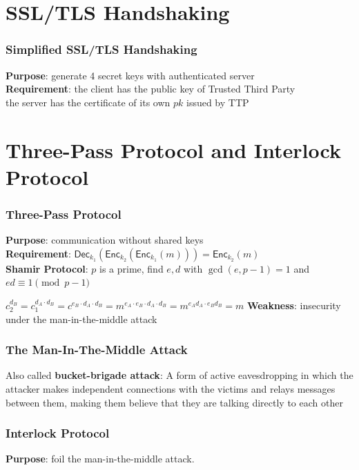 \section{SSL/TLS Handshaking}
\begin{frame}\frametitle{Simplified SSL/TLS Handshaking}
\textbf{Purpose}: generate 4 secret keys with authenticated server\\
\textbf{Requirement}: the client has the public key of Trusted Third Party\\
the server has the certificate of its own $pk$ issued by TTP
\begin{figure}
\begin{center}

\end{center}
\end{figure}
\end{frame}
\section{Three-Pass Protocol and Interlock Protocol}
\begin{frame}\frametitle{Three-Pass Protocol}
\textbf{Purpose}: communication without shared keys\\
\textbf{Requirement}: $\mathsf{Dec}_{k_1}(\mathsf{Enc}_{k_2}(\mathsf{Enc}_{k_1}(m))) = \mathsf{Enc}_{k_2}(m)$\\
\textbf{Shamir Protocol}: $p$ is a prime, find $e,d$ with $\gcd(e,p-1)=1$ and $ed \equiv 1 \pmod{p-1}$

\begin{figure}
\begin{center}

\end{center}
\end{figure}
$c_2^{d_B} = c_1^{d_A\cdot d_B} = c^{e_B\cdot d_A\cdot d_B} = m^{e_A\cdot e_B\cdot d_A\cdot d_B} = m^{e_Ad_A\cdot e_Bd_B} = m$
\textbf{Weakness}: insecurity under the man-in-the-middle attack
\end{frame}
\begin{frame}\frametitle{The Man-In-The-Middle Attack}
Also called \textbf{bucket-brigade attack}: A form of active eavesdropping in which the attacker makes independent connections with the victims and relays messages between them, making them believe that they are talking directly to each other
\begin{figure}
\begin{center}

\end{center}
\end{figure}
\end{frame}
\begin{frame}\frametitle{Interlock Protocol}
\textbf{Purpose}: foil the man-in-the-middle attack.
\begin{figure}
\begin{center}

\end{center}
\end{figure}
\end{frame}
